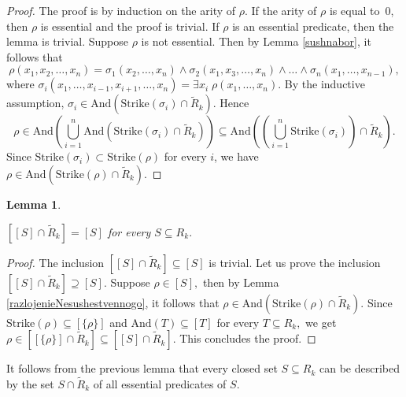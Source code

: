 \documentclass{au}
\theoremstyle{plain}
\newtheorem{lemma}{Lemma}
\theoremstyle{definition}
\theoremstyle{remark}
\numberwithin{equation}{section}
\begin{document}
\begin{proof}

The proof is by induction on the arity of $\rho.$
If the arity of $\rho$ is equal to~0, then $\rho$ is essential and the proof is trivial.
If $\rho$ is an essential predicate, then the lemma is trivial.
Suppose $\rho$ is not essential.
Then by Lemma \ref{sushnabor}, it follows that
$$\rho (x_{1},x_{2},\ldots,x_{n}) = \sigma_{1}(x_{2},\ldots,x_{n})\wedge  \sigma_{2}(x_{1},x_{3},\ldots,x_{n})\wedge
\ldots\wedge \sigma_{n}(x_{1},\ldots,x_{n-1}),$$
where $\sigma_{i}(x_{1},\ldots,x_{i-1},x_{i+1},\ldots,x_{n}) =
\exists x_{i}\; \rho(x_{1},\ldots,x_{n}).$
By the inductive assumption,
$\sigma_{i} \in  {
\mathrm{And}
}({
\mathrm{Strike}
}(\sigma_{i})\cap \widetilde R_{k}).$
Hence
$$\rho \in {
\mathrm{And}
}\left(\bigcup \limits_{i=1}^{n} {
\mathrm{And}
}\left({
\mathrm{Strike}
}(\sigma_{i})\cap \widetilde R_{k}\right)\right)
\subseteq  {
\mathrm{And}
}\left( \left(\bigcup \limits_{i=1}^{n} {
\mathrm{Strike}
}(\sigma_{i})\right) \cap \widetilde R_{k}\right).$$
Since
${
\mathrm{Strike}
}(\sigma_{i})\subset {
\mathrm{Strike}
}(\rho)$ for every $i$,
we have $\rho \in {
\mathrm{And}
}({
\mathrm{Strike}
}(\rho)\cap \widetilde R_{k}).$

\end{proof}

\begin{lemma}\label{SuzhZamkn}

$[[S]\cap \widetilde R_{k}] = [S]$ for every $S\subseteq R_{k}.$

\end{lemma}

\begin{proof}

The inclusion $[[S]\cap \widetilde R_{k}] \subseteq [S]$ is trivial.
Let us prove the inclusion $[[S]\cap \widetilde R_{k}] \supseteq [S].$
Suppose $\rho \in [S],$ then by Lemma \ref{razlojenieNesushestvennogo},
it follows that $\rho \in {
\mathrm{And}
}({
\mathrm{Strike}
}(\rho)\cap \widetilde R_{k}).$
Since ${
\mathrm{Strike}
}(\rho)\subseteq [\{\rho\}]$ and ${
\mathrm{And}
}(T)\subseteq [T]$ for every
$T\subseteq R_{k},$ we get
$\rho \in [[\{\rho\}]\cap \widetilde R_{k}]\subseteq [[S]\cap \widetilde R_{k}].$
This concludes the proof.

\end{proof}

It follows from the previous lemma that every closed set $S\subseteq R_{k}$
can be described by the set $S\cap \widetilde R_{k}$ of all essential predicates of $S.$
\end{document}
